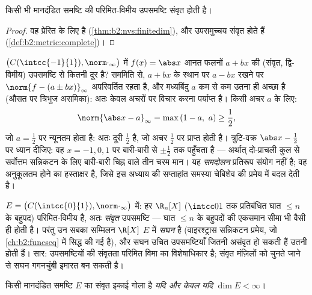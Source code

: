 \begin{corollary}\label{cor:b2:nvs:closedsubspace}
किसी भी मानदंडित समष्टि की परिमित-विमीय उपसमष्टि संवृत होती है।
\end{corollary}

\begin{proof}
वह प्रेरित  के लिए  है (\cref{thm:b2:nvs:finitedim}), और  उपसमुच्चय संवृत होते
हैं (\cref{def:b2:metric:complete})।
\end{proof}

\begin{example}\label{ex:b2:nvs:bestaffine}
$\bigl(C(\intcc{-1}{1}), \norm\cdot_\infty\bigr)$ में $f(x) = \abs x$ आनत फलनों $a + bx$ की (संवृत, द्वि-विमीय) उपसमष्टि से कितनी दूर
है? सममिति से, $a + bx$ के स्थान पर $a - bx$ रखने पर $\norm{f - (a \pm bx)}_\infty$ अपरिवर्तित रहता है, और
मध्यबिंदु $a$ कम से कम उतना ही अच्छा है (औसत पर त्रिभुज असमिका): अतः
केवल अचरों पर विचार करना पर्याप्त है। किसी अचर $a$ के लिए:
\[
\norm{\abs x - a}_\infty = \max\,(1 - a,\ a)
\geq \frac12 ,
\]
जो $a = \frac12$ पर न्यूनतम होता है: अतः दूरी $\frac12$ है, जो अचर $\frac12$ पर प्राप्त
होती है। त्रुटि-वक्र $\abs x -
\frac12$ पर ध्यान दीजिए: वह $x = -1, 0,
1$ पर बारी-बारी से $\pm\frac12$
तक पहुँचता है --- अर्थात् दो-प्राचली कुल से सर्वोत्तम सन्निकटन के लिए
बारी-बारी चिह्न वाले तीन चरम मान। यह \emph{समदोलन} प्रतिरूप संयोग नहीं
है; वह अनुकूलतम होने का हस्ताक्षर है, जिसे इस अध्याय की सप्ताहांत समस्या
चेबिशेव की प्रमेय में बदल देती है।
\end{example}

\begin{example}\label{ex:b2:nvs:closeddense}
$E = \bigl(C(\intcc{0}{1}), \norm\cdot_\infty\bigr)$ में: हर $\R_n[X]$ ($\intcc01$ तक प्रतिबंधित घात $\leq n$ के बहुपद) परिमित-विमीय है,
अतः \emph{संवृत} उपसमष्टि --- घात $\leq n$ के बहुपदों की एकसमान सीमा भी वैसी
ही होती है। परंतु उन सबका सम्मिलन $\R[X]$ $E$ में \emph{सघन} है (वाइरश्ट्रास
सन्निकटन प्रमेय, जो \cref{ch:b2:funcseq} में सिद्ध की गई है), और सघन उचित उपसमष्टियाँ
जितनी असंवृत हो सकती हैं उतनी होती हैं। सार: उपसमष्टियों की संवृतता
परिमित विमा का विशेषाधिकार है; संवृत मंज़िलों को चुनते जाने से सघन
गगनचुंबी इमारत बन सकती है।
\end{example}

\begin{theorem}[रीस]\label{thm:b2:nvs:riesz}
किसी मानदंडित समष्टि $E$ का संवृत इकाई गोला  है \emph{यदि और केवल
यदि} $\dim E < \infty$।
\end{theorem}


